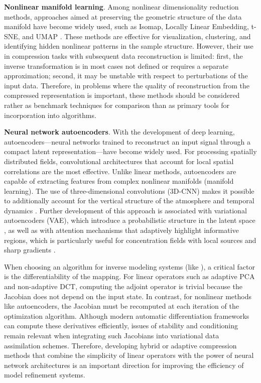 \documentclass[pdflatex,sn-mathphys-num]{sn-jnl}%
\theoremstyle{thmstyleone}%
\theoremstyle{thmstyletwo}%
\theoremstyle{thmstylethree}%
\begin{document}
\textbf{Nonlinear manifold learning}. Among nonlinear dimensionality reduction methods, approaches aimed at preserving the geometric structure of the data manifold have become widely used, such as Isomap, Locally Linear Embedding, t-SNE, and UMAP \cite{Tenenbaum2000,Roweis2000,vanDerMaaten2008,McInnes2018}. These methods are effective for visualization, clustering, and identifying hidden nonlinear patterns in the sample structure. However, their use in compression tasks with subsequent data reconstruction is limited: first, the inverse transformation is in most cases not defined or requires a separate approximation; second, it may be unstable with respect to perturbations of the input data. Therefore, in problems where the quality of reconstruction from the compressed representation is important, these methods should be considered rather as benchmark techniques for comparison than as primary tools for incorporation into algorithms.

\textbf{Neural network autoencoders}. With the development of deep learning, autoencoders—neural networks trained to reconstruct an input signal through a compact latent representation—have become widely used. For processing spatially distributed fields, convolutional architectures that account for local spatial correlations are the most effective. Unlike linear methods, autoencoders are capable of extracting features from complex nonlinear manifolds (manifold learning). The use of three-dimensional convolutions (3D-CNN) makes it possible to additionally account for the vertical structure of the atmosphere and temporal dynamics \cite{Cheng2024}. Further development of this approach is associated with variational autoencoders (VAE), which introduce a probabilistic structure in the latent space \cite{Kingma2013}, as well as with attention mechanisms that adaptively highlight informative regions, which is particularly useful for concentration fields with local sources and sharp gradients \cite{Bahdanau2014,Vaswani2017,Dosovitskiy2020,Liu2021}.

When choosing an algorithm for inverse modeling systems (like \cite{Penenko2025b}), a critical factor is the differentiability of the mapping. For linear operators such as adaptive PCA and non-adaptive DCT, computing the adjoint operator is trivial because the Jacobian does not depend on the input state. In contrast, for nonlinear methods like autoencoders, the Jacobian must be recomputed at each iteration of the optimization algorithm. Although modern automatic differentiation frameworks can compute these derivatives efficiently, issues of stability and conditioning remain relevant when integrating such Jacobians into variational data assimilation schemes. Therefore, developing hybrid or adaptive compression methods that combine the simplicity of linear operators with the power of neural network architectures is an important direction for improving the efficiency of model refinement systems.
\end{document}
